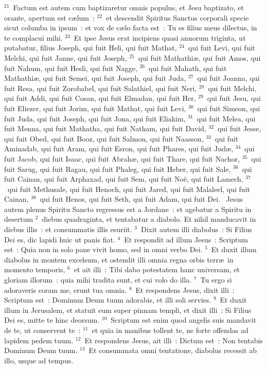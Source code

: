 ${}^{21}$~Factum est autem cum baptizaretur omnis populus, et Jesu baptizato, et orante, apertum est c\ae lum~:
${}^{22}$~et descendit Spiritus Sanctus corporali specie sicut columba in ipsum~: et vox de c\ae lo facta est~: Tu es filius meus dilectus, in te complacui mihi.
${}^{23}$~Et ipse Jesus erat incipiens quasi annorum triginta, ut putabatur, filius Joseph, qui fuit Heli, qui fuit Mathat,
${}^{24}$~qui fuit Levi, qui fuit Melchi, qui fuit Janne, qui fuit Joseph,
${}^{25}$~qui fuit Mathathi\ae , qui fuit Amos, qui fuit Nahum, qui fuit Hesli, qui fuit Nagge,
${}^{26}$~qui fuit Mahath, qui fuit Mathathi\ae , qui fuit Semei, qui fuit Joseph, qui fuit Juda,
${}^{27}$~qui fuit Joanna, qui fuit Resa, qui fuit Zorobabel, qui fuit Salathiel, qui fuit Neri,
${}^{28}$~qui fuit Melchi, qui fuit Addi, qui fuit Cosan, qui fuit Elmadan, qui fuit Her,
${}^{29}$~qui fuit Jesu, qui fuit Eliezer, qui fuit Jorim, qui fuit Mathat, qui fuit Levi,
${}^{30}$~qui fuit Simeon, qui fuit Juda, qui fuit Joseph, qui fuit Jona, qui fuit Eliakim,
${}^{31}$~qui fuit Melea, qui fuit Menna, qui fuit Mathatha, qui fuit Natham, qui fuit David,
${}^{32}$~qui fuit Jesse, qui fuit Obed, qui fuit Booz, qui fuit Salmon, qui fuit Naasson,
${}^{33}$~qui fuit Aminadab, qui fuit Aram, qui fuit Esron, qui fuit Phares, qui fuit Jud\ae ,
${}^{34}$~qui fuit Jacob, qui fuit Isaac, qui fuit Abrah\ae , qui fuit Thare, qui fuit Nachor,
${}^{35}$~qui fuit Sarug, qui fuit Ragau, qui fuit Phaleg, qui fuit Heber, qui fuit Sale,
${}^{36}$~qui fuit Cainan, qui fuit Arphaxad, qui fuit Sem, qui fuit No\"e, qui fuit Lamech,
${}^{37}$~qui fuit Methusale, qui fuit Henoch, qui fuit Jared, qui fuit Malaleel, qui fuit Cainan,
${}^{38}$~qui fuit Henos, qui fuit Seth, qui fuit Adam, qui fuit Dei.
~Jesus autem plenus Spiritu Sancto regressus est a Jordane~: et agebatur a Spiritu in desertum
${}^{2}$~diebus quadraginta, et tentabatur a diabolo. Et nihil manducavit in diebus illis~: et consummatis illis esuriit.
${}^{3}$~Dixit autem illi diabolus~: Si Filius Dei es, dic lapidi huic ut panis fiat.
${}^{4}$~Et respondit ad illum Jesus~: Scriptum est~: Quia non in solo pane vivit homo, sed in omni verbo Dei.
${}^{5}$~Et duxit illum diabolus in montem excelsum, et ostendit illi omnia regna orbis terr\ae\ in momento temporis,
${}^{6}$~et ait illi~: Tibi dabo potestatem hanc universam, et gloriam illorum~: quia mihi tradita sunt, et cui volo do illa.
${}^{7}$~Tu ergo si adoraveris coram me, erunt tua omnia.
${}^{8}$~Et respondens Jesus, dixit illi~: Scriptum est~: Dominum Deum tuum adorabis, et illi soli servies.
${}^{9}$~Et duxit illum in Jerusalem, et statuit eum super pinnam templi, et dixit illi~: Si Filius Dei es, mitte te hinc deorsum.
${}^{10}$~Scriptum est enim quod angelis suis mandavit de te, ut conservent te~:
${}^{11}$~et quia in manibus tollent te, ne forte offendas ad lapidem pedem tuum.
${}^{12}$~Et respondens Jesus, ait illi~: Dictum est~: Non tentabis Dominum Deum tuum.
${}^{13}$~Et consummata omni tentatione, diabolus recessit ab illo, usque ad tempus.


